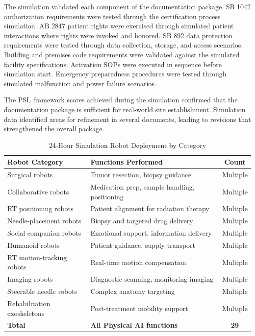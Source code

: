 The simulation validated each component of the documentation package. SB 1042
authorization requirements were tested through the certification process
simulation. AB 2847 patient rights were exercised through simulated patient
interactions where rights were invoked and honored. SB 892 data protection
requirements were tested through data collection, storage, and access
scenarios. Building and premises code requirements were validated against the
simulated facility specifications. Activation SOPs were executed in sequence
before simulation start. Emergency preparedness procedures were tested through
simulated malfunction and power failure scenarios.

The PSL framework scores achieved during the simulation confirmed that the
documentation package is sufficient for real-world site establishment.
Simulation data identified areas for refinement in several documents, leading
to revisions that strengthened the overall package.

\begin{table}[H]
\centering
\caption{24-Hour Simulation Robot Deployment by Category}
\label{tab:simulation-robots}
\small
\begin{tabularx}{\textwidth}{l X c}
\toprule
\textbf{Robot Category} & \textbf{Functions Performed} & \textbf{Count} \\
\midrule
Surgical robots & Tumor resection, biopsy guidance & Multiple \\
Collaborative robots & Medication prep, sample handling, positioning & Multiple \\
RT positioning robots & Patient alignment for radiation therapy & Multiple \\
Needle-placement robots & Biopsy and targeted drug delivery & Multiple \\
Social companion robots & Emotional support, information delivery & Multiple \\
Humanoid robots & Patient guidance, supply transport & Multiple \\
RT motion-tracking robots & Real-time motion compensation & Multiple \\
Imaging robots & Diagnostic scanning, monitoring imaging & Multiple \\
Steerable needle robots & Complex anatomy targeting & Multiple \\
Rehabilitation exoskeletons & Post-treatment mobility support & Multiple \\
\midrule
\textbf{Total} & \textbf{All Physical AI functions} & \textbf{29} \\
\bottomrule
\end{tabularx}
\end{table}

